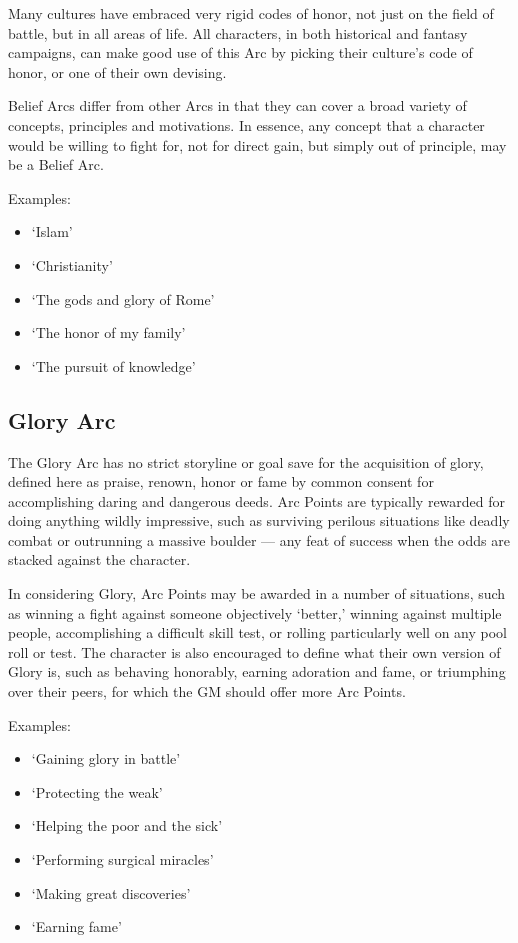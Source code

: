 \documentclass[oneside,11pt,english]{book}
\begin{document}
Many cultures have embraced very rigid codes of honor, not just on the field of battle, but in all areas of 
life. All characters, in both historical and fantasy campaigns, can make good use of this Arc by picking 
their culture’s code of honor, or one of their own devising. 


Belief Arcs differ from other Arcs in that they can cover a broad variety of concepts, principles and 
motivations. In essence, any concept that a character would be willing to fight for, not for direct gain, but 
simply out of principle, may be a Belief Arc. 


Examples: 
\begin{itemize}
\item ‘Islam’ 
\item ‘Christianity’ 
\item ‘The gods and glory of Rome’ 
\item ‘The honor of my family’ 
\item ‘The pursuit of knowledge’ 
\end{itemize}


\subsection{Glory Arc} 
The Glory Arc has no strict storyline or goal save for the acquisition of glory, defined here as praise, 
renown, honor or fame by common consent for accomplishing daring and dangerous deeds. Arc Points 
are typically rewarded for doing anything wildly impressive, such as surviving perilous situations like 
deadly combat or outrunning a massive boulder — any feat of success when the odds are stacked against 
the character. 


In considering Glory, Arc Points may be awarded in a number of situations, such as winning a fight 
against someone objectively ‘better,’ winning against multiple people, accomplishing a difficult skill test, 
or rolling particularly well on any pool roll or test. The character is also encouraged to define what their 
own version of Glory is, such as behaving honorably, earning adoration and fame, or triumphing over 
their peers, for which the GM should offer more Arc Points. 



Examples: 
\begin{itemize}
\item ‘Gaining glory in battle’ 
\item ‘Protecting the weak’ 
\item ‘Helping the poor and the sick’ 
\item ‘Performing surgical miracles’ 
\item ‘Making great discoveries’ 
\item ‘Earning fame’ 
\end{itemize}
\end{document}
